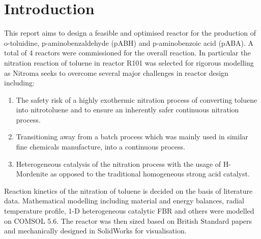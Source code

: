 \section{Introduction}
This report aims to design a feasible and optimised reactor for the production of o-toluidine, p-aminobenzaldehyde (pABH) and p-aminobenzoic acid (pABA). A total of 4 reactors were commissioned for the overall reaction. 
In particular the nitration reaction of toluene in reactor R101 was selected for rigorous modelling as Nitroma seeks to overcome several major challenges in reactor design including:

\begin{enumerate}
    \item The safety risk of a highly exothermic nitration process of converting toluene into nitrotoluene and to ensure an inherently safer continuous nitration process. 
    \item Transitioning away from a batch process which was mainly used in similar fine chemicals manufacture, into a continuous process. 
    \item Heterogeneous catalysis of the nitration process with the usage of H-Mordenite as opposed to the traditional homogeneous strong acid catalyst. 
\end{enumerate}

Reaction kinetics of the nitration of toluene is decided on the basis of literature data. Mathematical modelling including material and energy balances, radial temperature profile, 1-D heterogeneous catalytic FBR and others were modelled on COMSOL 5.6. The reactor was then sized based on British Standard papers and mechanically designed in SolidWorks for visualisation.



